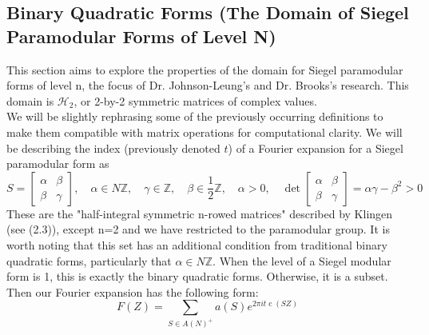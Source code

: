 \documentclass[11pt, oneside]{amsart}
\begin{document}
\subsection{Binary Quadratic Forms (The Domain of Siegel Paramodular Forms of Level N)}
This section aims to explore the properties of the domain for Siegel paramodular forms of level n, the focus of Dr. Johnson-Leung's and Dr. Brooks's research. This domain is $\mathcal{H}_{2}$, or 2-by-2 symmetric matrices of complex values.\\
We will be slightly rephrasing some of the previously occurring definitions to make them compatible with matrix operations for computational clarity. We will be describing the index (previously denoted $t$) of a Fourier expansion for a Siegel paramodular form as $$S=\left[ \begin{matrix}\alpha & \beta \\ \beta & \gamma \end{matrix}\right], \quad \alpha \in N \mathbb{Z}, \quad \gamma \in \mathbb{Z}, \quad \beta \in \frac{1}{2} \mathbb{Z}, \quad \alpha>0, \quad \operatorname{det} \left[ \begin{matrix} \alpha & \beta \\ \beta & \gamma \end{matrix}\right]=\alpha \gamma-\beta^{2}>0$$
These are the "half-integral symmetric n-rowed matrices" described by Klingen (see (2.3)), except n=2 and we have restricted to the paramodular group. It is worth noting that this set has an additional condition from traditional binary quadratic forms, particularly that $\alpha\in N\mathbb{Z}$. When the level of a Siegel modular form is 1, this is exactly the binary quadratic forms. Otherwise, it is a subset.
\\
Then our Fourier expansion has the following form: $$F(Z)=\sum_{S \in A(N)^{+}} a(S) e^{2 \pi i t \operatorname{c}(S Z)}$$
\end{document}
